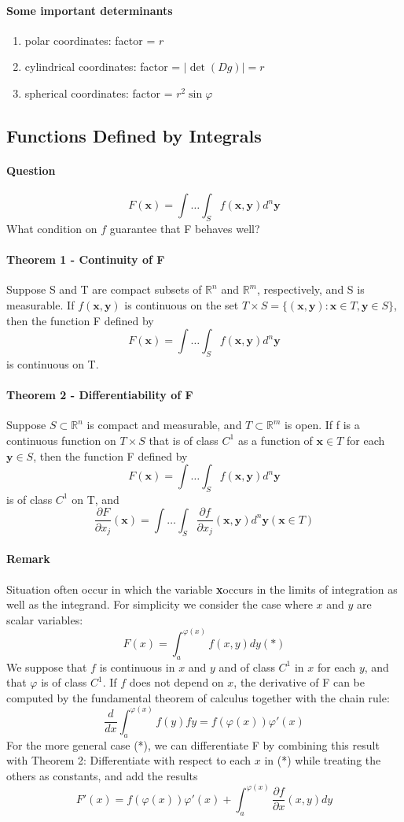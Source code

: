 \documentclass[11pt]{article}
\newcommand{\tb}[1]{\textbf{#1}}
\newcommand{\real}[0]{\mathbb{R}}
\newcommand{\vx}[0]{\tb{x}}
\newcommand{\vy}[0]{\tb{y}}
\begin{document}
\paragraph{Some important determinants}
\begin{enumerate}
    \item polar coordinates: factor = $r$
    \item cylindrical coordinates: factor = $|\det(Dg)| = r$
    \item spherical coordinates: factor = $r^2\sin\varphi$
\end{enumerate}

\subsection{Functions Defined by Integrals}
\paragraph{Question}  $$ F(\vx) = \int\hdots\int_S f(\vx,\vy)d^n\vy$$ What condition on $f$ guarantee that F behaves well?
\paragraph{Theorem 1 - Continuity of F} Suppose S and T are compact subsets of $\real^n$ and $\real^m$, respectively, and S is measurable. If $f(\vx, \vy)$ is continuous on the set $T \times S = \{(\vx, \vy): \vx \in T, \vy \in S\}$, then the function F defined by $$ F(\vx) = \int\hdots\int_S f(\vx,\vy)d^n\vy$$ is continuous on T.
\paragraph{Theorem 2 - Differentiability of F} Suppose $S \subset \real^n$ is compact and measurable, and $T \subset \real^m$ is open. If f is a continuous function on $T \times S$ that is of class $C^1$ as a function of $\vx \in T$ for each $\vy \in S$, then the function F defined by $$ F(\vx) = \int\hdots\int_S f(\vx,\vy)d^n\vy$$ is of class $C^1$ on T, and 
    $$ \frac{\partial F}{\partial x_j}(\vx) = \int \hdots \int_S \frac{\partial f}{\partial x_j}(\vx, \vy) d^n\vy (\vx \in T)$$
\paragraph{Remark} Situation often occur in which the variable \vx occurs in the limits of integration as well as the integrand. For simplicity we consider the case where $x$ and $y$ are scalar variables: $$F(x) = \int_a^{\varphi(x)} f(x,y)dy (*)$$
We suppose that $f$ is continuous in $x$ and $y$ and of class $C^1$ in $x$ for each $y$, and that $\varphi$ is of class $C^1$. If $f$ does not depend on $x$, the derivative of F can be computed by the fundamental theorem of calculus together with the chain rule:
$$\frac{d}{dx}\int_a^{\varphi(x)}f(y)fy = f(\varphi(x))\varphi'(x)$$
For the more general case (*), we can differentiate F by combining this result with Theorem 2: Differentiate with respect to each $x$ in (*) while treating the others as constants, and add the results
$$F'(x) = f(\varphi(x))\varphi'(x) + \int_a^{\varphi(x)}\frac{\partial f}{\partial x}(x,y) dy$$
\end{document}
